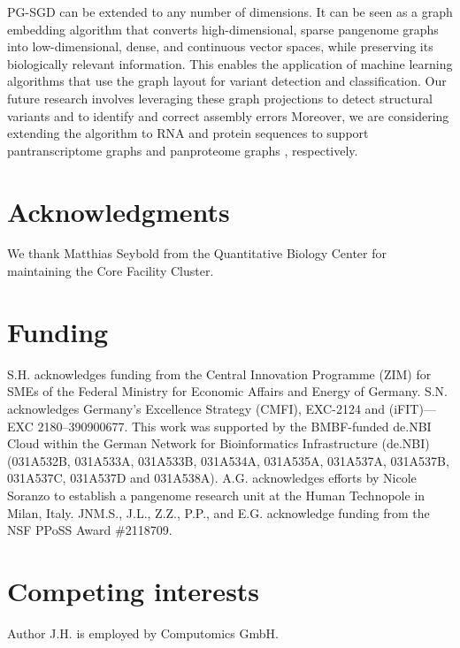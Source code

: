 \documentclass{bioinfo}
\theoremstyle{definition}
\begin{document}
	PG-SGD can be extended to any number of dimensions.
	It can be seen as a graph embedding algorithm that converts high-dimensional, sparse pangenome graphs into low-dimensional, dense, and continuous vector spaces, while preserving its biologically relevant information.
	This enables the application of machine learning algorithms that use the graph layout for variant detection and classification. 
	Our future research involves leveraging these graph projections to detect structural variants and to identify and correct assembly errors
	Moreover, we are considering extending the algorithm to RNA and protein sequences to support pantranscriptome graphs \citep{sibbesen_haplotype-aware_2023} and panproteome graphs \citep{dabbaghie_panpa:_2023}, respectively.

	\section*{Acknowledgments}
	
	We thank Matthias Seybold from the Quantitative Biology Center for maintaining the Core Facility Cluster.
	
	\section*{Funding}
	
	S.H. acknowledges funding from the Central Innovation Programme (ZIM) for SMEs of the Federal Ministry for Economic Affairs and Energy of Germany.
	S.N. acknowledges Germany’s Excellence Strategy (CMFI), EXC-2124 and (iFIT)—EXC 2180–390900677.
	This work was supported by the BMBF-funded de.NBI Cloud within the German Network for Bioinformatics Infrastructure (de.NBI) (031A532B, 031A533A, 031A533B, 031A534A, 031A535A, 031A537A, 031A537B, 031A537C, 031A537D and 031A538A).
	A.G. acknowledges efforts by Nicole Soranzo to establish a pangenome research unit at the Human Technopole in Milan, Italy.
	JNM.S., J.L., Z.Z., P.P., and E.G. acknowledge funding from the NSF PPoSS Award \#2118709.
	
	\section*{Competing interests}
	Author J.H. is employed by Computomics GmbH.
	
\end{document}
